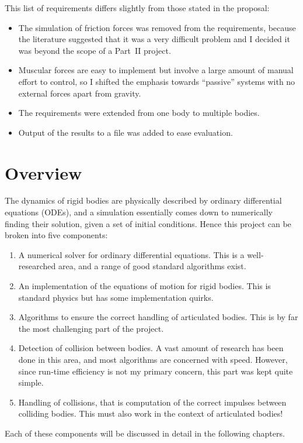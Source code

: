 This list of requirements differs slightly from those stated in the proposal:
\begin{itemize}
\item The simulation of friction forces was removed from the requirements, because the literature
    suggested that it was a very difficult problem and I decided it was beyond the scope of a
    Part~II project.
\item Muscular forces are easy to implement but involve a large amount of manual effort to
    control, so I shifted the emphasis towards ``passive'' systems with no external forces apart
    from gravity.
\item The requirements were extended from one body to multiple bodies.
\item Output of the results to a file was added to ease evaluation.
\end{itemize}

\section{Overview}

The dynamics of rigid bodies are physically described by ordinary differential equations (ODEs),
and a simulation essentially comes down to numerically finding their solution, given a set of
initial conditions. Hence this project can be broken into five components:

\begin{enumerate}
\item A numerical solver for ordinary differential equations. This is a well-researched area, and
    a range of good standard algorithms exist.
\item An implementation of the equations of motion for rigid bodies. This is standard physics but
    has some implementation quirks.
\item Algorithms to ensure the correct handling of articulated bodies. This is by far the most
    challenging part of the project.
\item Detection of collision between bodies. A vast amount of research has been done in this area,
    and most algorithms are concerned with speed. However, since run-time efficiency is not my
    primary concern, this part was kept quite simple.
\item Handling of collisions, that is computation of the correct impulses between colliding
    bodies. This must also work in the context of articulated bodies!
\end{enumerate}

Each of these components will be discussed in detail in the following chapters.
